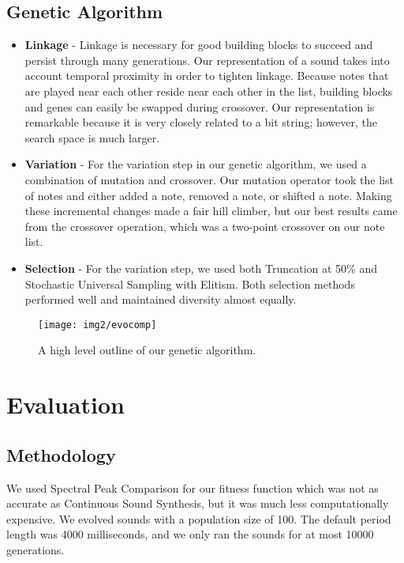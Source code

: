 \documentclass{pnastwo}
\begin{document}
\begin{article}
\subsection{Genetic Algorithm}
\begin{itemize}
\item \textbf{Linkage} - Linkage is necessary for good building blocks to succeed and persist through many generations. Our representation of a sound takes into account temporal proximity in order to tighten linkage. Because notes that are played near each other reside near each other in the list, building blocks and genes can easily be swapped during crossover. Our representation is remarkable because it is very closely related to a bit string; however, the search space is much larger.\\
\item \textbf{Variation} - For the variation step in our genetic algorithm, we used a combination of mutation and crossover. Our mutation operator took the list of notes and either added a note, removed a note, or shifted a note. Making these incremental changes made a fair hill climber, but our best results came from the crossover operation, which was a two-point crossover on our note list. \\
\item \textbf{Selection} - For the variation step, we used both Truncation at 50\% and Stochastic Universal Sampling with Elitism. Both selection methods performed well and maintained diversity almost equally.
\end{itemize}

\begin{figure*}
\centerline{\texttt{[image: img2/evocomp]}}
\caption{A high level outline of our genetic algorithm.}\label{fig2}
\end{figure*}

\section{Evaluation}
\subsection{Methodology}
We used Spectral Peak Comparison for our fitness function which was not as accurate as
Continuous Sound Synthesis, but it was much less computationally expensive. We evolved sounds with
a population size of 100. The default period length was 4000 milliseconds, and we only ran the sounds
for at most 10000 generations.

\end{article}
\end{document}

